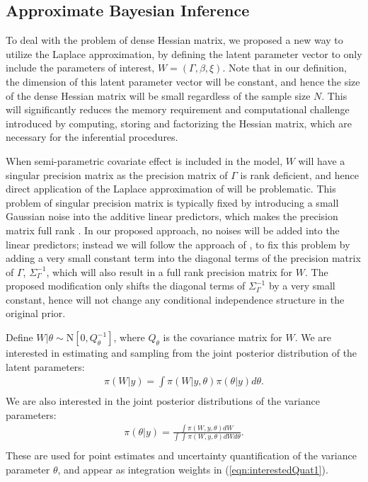 \documentclass[ba]{imsart}
\begin{document}
\subsection{Approximate Bayesian Inference}\label{subsec:abi}


To deal with the problem of dense Hessian matrix, we proposed a new way to utilize the Laplace approximation, by defining the latent parameter vector to only include the parameters of interest, $W = (\Gamma, \beta, \xi)$. Note that in our definition, the dimension of this latent parameter vector will be constant, and hence the size of the dense Hessian matrix will be small regardless of the sample size $N$. This will significantly reduces the memory requirement and computational challenge introduced by computing, storing and factorizing the Hessian matrix, which are necessary for the inferential procedures. 

When semi-parametric covariate effect is included in the model, $W$ will have a singular precision matrix as the precision matrix of $\Gamma$ is rank deficient, and hence direct application of the Laplace approximation of \cite{tierney} will be problematic. This problem of singular precision matrix is typically fixed by introducing a small Gaussian noise into the additive linear predictors, which makes the precision matrix full rank \citep{casecross, inla}. In our proposed approach, no noises will be added into the linear predictors; instead we will follow the approach of \cite{wood2011fast}, to fix this problem by adding a very small constant term into the diagonal terms of the precision matrix of $\Gamma$, $\Sigma^{-1}_\Gamma$, which will also result in a full rank precision matrix for $W$. 
The proposed modification only shifts the diagonal terms of $\Sigma^{-1}_\Gamma$ by a very small constant, hence will not change any conditional independence structure in the original prior.


Define $W|\theta\sim\text{N}\left[ 0,Q^{-1}_{\theta}\right]$, where $Q_{\theta}$ is the covariance matrix for $W$. 
We are interested in estimating and sampling from the joint posterior distribution of the latent parameters:
\begin{equation}\begin{aligned}\label{eqn:interestedQuat1}
\pi(W|y) = \int \pi(W|y,\theta) \pi(\theta|y) d\theta .  \\
\end{aligned}\end{equation}
We are also interested in the joint posterior distributions of the variance parameters:
\begin{equation}\begin{aligned}\label{eqn:interestedQuat2}
\pi(\theta|y) = \frac{\int \pi(W,y,\theta) dW}{\int_{} \int_{} \pi(W,y,\theta) dW d\theta } . \\
\end{aligned}\end{equation}
These are used for point estimates and uncertainty quantification of the variance parameter $\theta$, and appear as integration weights in (\ref{eqn:interestedQuat1}). 
\end{document}
